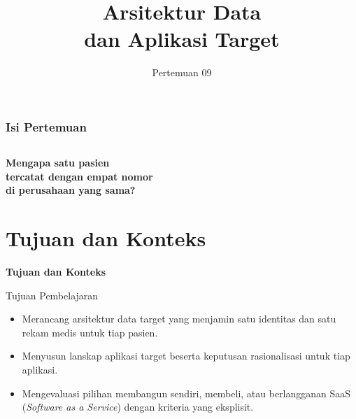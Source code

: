 \documentclass[aspectratio=169, table, 12pt]{beamer}
\title{\Huge Arsitektur Data\\ \vspace{10pt} dan Aplikasi Target}
\date{Pertemuan 09}
\begin{document}
\frame{\titlepage}

\begin{frame}
  \frametitle{Isi Pertemuan}
  \vspace{14pt}
  \begin{columns}[t]
    {\small\tableofcontents[sections={1-3}]}

    {\small\tableofcontents[sections={4-5}]}
  \end{columns}
\end{frame}

\begin{frame}{\hfill}
  \centering
  \Huge{\textbf{Mengapa satu pasien\\tercatat dengan empat nomor\\di perusahaan yang sama?}}
\end{frame}

\section{Tujuan dan Konteks}

\begin{frame}{\hfill}
  \centering
  \Huge{\textbf{Tujuan dan Konteks}}
\end{frame}

\begin{frame}{{\Large Tujuan Pembelajaran}}
  \vspace{10pt}
  \begin{itemize}
    \item Merancang arsitektur data target yang menjamin satu identitas dan satu rekam medis untuk
          tiap pasien.
    \item Menyusun lanskap aplikasi target beserta keputusan rasionalisasi untuk tiap aplikasi.
    \item Mengevaluasi pilihan membangun sendiri, membeli, atau berlangganan SaaS
          (\textit{Software as a Service}) dengan kriteria yang eksplisit.
  \end{itemize}
\end{frame}
\end{document}
